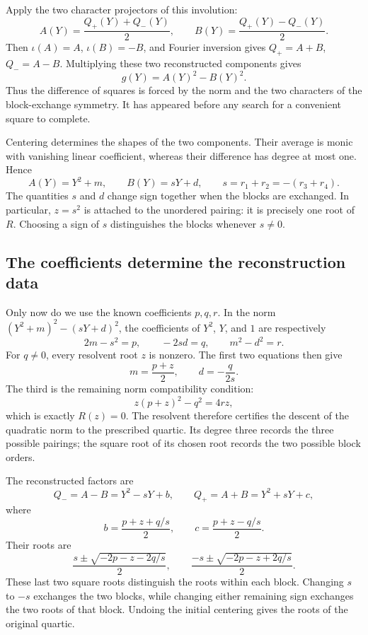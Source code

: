 \documentclass[11pt]{article}
\theoremstyle{remark}
\begin{document}
Apply the two character projectors of this involution:
\[
A(Y)=\frac{Q_+(Y)+Q_-(Y)}{2},\qquad
B(Y)=\frac{Q_+(Y)-Q_-(Y)}{2}.
\]
Then \(\iota(A)=A\), \(\iota(B)=-B\), and Fourier inversion gives \(Q_+=A+B\), \(Q_-=A-B\). Multiplying these two reconstructed components gives
\begin{equation}
g(Y)=A(Y)^2-B(Y)^2.
\label{eq:quartic-block-norm}
\end{equation}
Thus the difference of squares is forced by the norm and the two characters of the block-exchange symmetry. It has appeared before any search for a convenient square to complete.

Centering determines the shapes of the two components. Their average is monic with vanishing linear coefficient, whereas their difference has degree at most one. Hence
\[
A(Y)=Y^2+m,\qquad B(Y)=sY+d,
\qquad s=r_1+r_2=-(r_3+r_4).
\]
The quantities \(s\) and \(d\) change sign together when the blocks are exchanged. In particular, \(z=s^2\) is attached to the unordered pairing: it is precisely one root of \(R\). Choosing a sign of \(s\) distinguishes the blocks whenever \(s\ne0\).

\subsection{The coefficients determine the reconstruction data}

Only now do we use the known coefficients \(p,q,r\). In the norm \((Y^2+m)^2-(sY+d)^2\), the coefficients of \(Y^2\), \(Y\), and \(1\) are respectively
\[
2m-s^2=p,\qquad -2sd=q,\qquad m^2-d^2=r.
\]
For \(q\ne0\), every resolvent root \(z\) is nonzero. The first two equations then give
\[
m=\frac{p+z}{2},\qquad d=-\frac{q}{2s}.
\]
The third is the remaining norm compatibility condition:
\[
z(p+z)^2-q^2=4rz,
\]
which is exactly \(R(z)=0\). The resolvent therefore certifies the descent of the quadratic norm to the prescribed quartic. Its degree three records the three possible pairings; the square root of its chosen root records the two possible block orders.

The reconstructed factors are
\[
Q_-=A-B=Y^2-sY+b,\qquad
Q_+=A+B=Y^2+sY+c,
\]
where
\begin{equation}
b=\frac{p+z+q/s}{2},\qquad
c=\frac{p+z-q/s}{2}.
\label{eq:quadratic-factors}
\end{equation}
Their roots are
\begin{equation}
\frac{s\pm\sqrt{-2p-z-2q/s}}{2},\qquad
\frac{-s\pm\sqrt{-2p-z+2q/s}}{2}.
\label{eq:ferrari-final}
\end{equation}
These last two square roots distinguish the roots within each block. Changing \(s\) to \(-s\) exchanges the two blocks, while changing either remaining sign exchanges the two roots of that block. Undoing the initial centering gives the roots of the original quartic.
\end{document}

